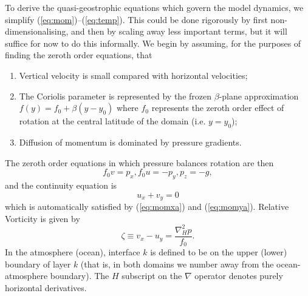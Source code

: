 \documentclass[11pt, a4paper,twoside]{article}
\numberwithin{equation}{section}
\begin{document}
To derive the quasi-geostrophic equations which govern the model dynamics, we simplify (\ref{eq:mom})--(\ref{eq:temp}).
This could be done rigorously by first non-dimensionalising, and then by scaling away less important terms, but it will suffice for now to do this informally.
We begin by assuming, for the purposes of finding the zeroth order equations, that
\begin{enumerate}
\item Vertical velocity is small compared with horizontal velocities;
\item The Coriolis parameter is represented by the frozen $\beta$-plane approximation $f(y)=f_0 + \beta (y - y_0)$ where $f_0$ represents the zeroth order effect of rotation at the central latitude of the domain (i.e. $y = y_0$);
\item Diffusion of momentum is dominated by pressure gradients.
\end{enumerate}
The zeroth order equations in which pressure balances rotation are then
\begin{subequations}
\begin{equation}\label{eq:momxa}
f_0v = p_x,
\end{equation}
\begin{equation}\label{eq:momya}
f_0 u = -p_y,
\end{equation}
\begin{equation}\label{eq:momza}
p_z = - g,
\end{equation}
\end{subequations}
and the continuity equation is
\begin{equation}\label{eq:conta}
u_x + v_y = 0
\end{equation}
which is automatically satisfied by (\ref{eq:momxa}) and (\ref{eq:momya}).
Relative Vorticity is given by
\begin{equation}\label{eq:vort}
\zeta \equiv v_x - u_y = \frac{\nabla_H^2 p}{f_0}.
\end{equation}
In the atmosphere (ocean), interface $k$ is defined to be on the upper (lower) boundary of layer $k$ (that is, in both domains we number away from the ocean-atmosphere boundary).
The $H$ subscript on the $\nabla$ operator denotes purely horizontal derivatives.
\end{document}
